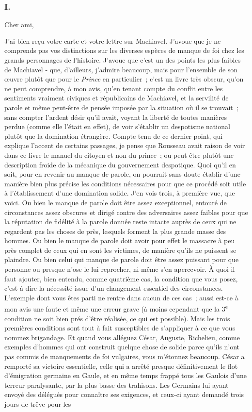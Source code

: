 \documentclass[french,twoside]{book} %
\begin{document}
\subsubsection[{I.}]{I.}
\noindent Cher ami,\par
J'ai bien reçu votre carte et votre lettre sur Machiavel. J'avoue que je ne comprends pas vos distinctions sur les diverses espèces de manque de foi chez les grands personnages de l'histoire. J'avoue que c'est un des points les plus faibles de Machiavel - que, d'ailleurs, j'admire beaucoup, mais pour l'ensemble de son œuvre plutôt que pour le {\itshape Prince} en particulier ; c'est un livre très obscur, qu'on ne peut comprendre, à mon avis, qu'en tenant compte du conflit entre les sentiments vraiment civiques et républicains de Machiavel, et la servilité de parole et même peut-être de pensée imposée par la situation où il se trouvait ; sans compter l'ardent désir qu'il avait, voyant la liberté de toutes manières perdue (comme elle l'était en effet), de voir s'établir un despotisme national plutôt que la domination étrangère. Compte tenu de ce dernier point, qui explique l'accent de certains passages, je pense que Rousseau avait raison de voir dans ce livre le manuel du citoyen et non du prince ; ou peut-être plutôt une description froide de la mécanique du gouvernement despotique. Quoi qu'il en soit, pour en revenir au manque de parole, on pourrait sans doute établir d'une manière bien plus précise les conditions nécessaires pour que ce procédé soit utile à l'établissement d'une domination solide. J'en vois trois, à première vue, que voici. Ou bien le manque de parole doit être assez exceptionnel, entouré de circonstances assez obscures et dirigé contre des adversaires assez faibles pour que la réputation de fidélité à la parole donnée reste intacte auprès de ceux qui ne regardent pas les choses de près, lesquels forment la plus grande masse des hommes. Ou bien le manque de parole doit avoir pour effet le massacre à peu près complet de ceux qui en sont les victimes, de manière qu'ils ne puissent se plaindre. Ou bien celui qui manque de parole doit être assez puissant pour que personne ou presque n'ose le lui reprocher, ni même s'en apercevoir. À quoi il faut ajouter, bien entendu, comme quatrième cas, la condition que vous posez, c'est-à-dire la nécessité issue d'un changement essentiel des circonstances. L'exemple dont vous êtes parti ne rentre dans aucun de ces cas ; aussi est-ce à mon avis une faute et même une erreur grave (à moins cependant que la 3\textsuperscript{e} condition ne soit bien prés d'être réalisée, ce qui est possible). Mais les trois premières conditions sont tout à fait susceptibles de s'appliquer à ce que vous nommez brigandage. Et quand vous alléguez César, Auguste, Richelieu, comme exemples d'hom­mes qui ont construit quelque chose de solide parce qu'ils n'ont pas commis de manquements de foi vulgaires, vous m'étonnez beaucoup. César a remporté sa victoire essentielle, celle qui a arrêté presque définitivement le flot d'émigra­tion germaine en Gaule, et en même temps frappé tous les Gaulois d'une terreur paralysante, par la plus basse des trahisons. Les Germains lui ayant envoyé des délégués pour connaître ses exigences, et ceux-ci ayant demandé trois jours de trêve pour les 
\end{document}
